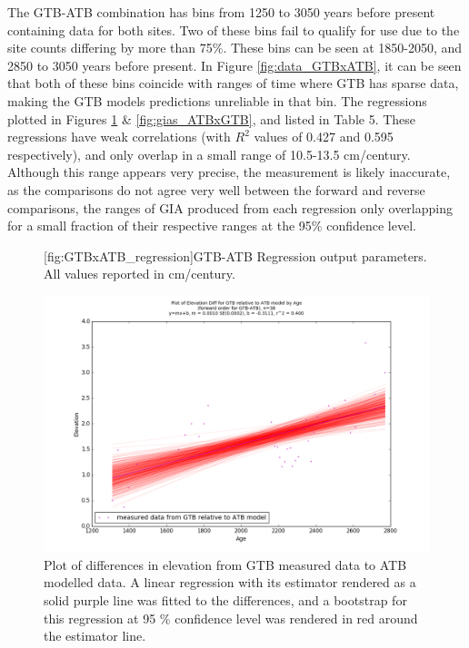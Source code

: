 The GTB-ATB combination has
bins from 1250 to 3050 years before present containing data for both sites. Two of these bins
fail to qualify for use due to the site counts differing by more
than 75\%. These bins can be seen at 1850-2050, and 2850 to 3050 years before present. 
In Figure \ref{fig:data_GTBxATB}, it can be seen that both of these bins coincide with ranges of
time where GTB has sparse data, making the GTB models predictions unreliable in that bin.
The regressions plotted in Figures \ref{fig:gias_GTBxATB} \& \ref{fig:gias_ATBxGTB}, and
listed in Table 5. These regressions have weak correlations
(with $R^2$ values of 0.427 and 0.595 respectively), and only overlap in a small
range of 10.5-13.5 cm/century. Although this range appears very precise, the measurement
is likely inaccurate, as the comparisons do not agree very well between the forward
and reverse comparisons, the ranges of GIA produced from each regression only
overlapping for a small fraction of their respective ranges at the 95\% confidence
level.\\

\begin{figure}[H]
	\begin{flushleft}
	
	[fig:GTBxATB_regression]{GTB-ATB Regression output parameters. All values reported in cm/century.}
	
	\end{flushleft}
\end{figure}

\newpage

\begin{figure}[H]
	\includegraphics[width=1.3\linewidth, angle=270 ]{data/bothNonZero/withinSeventyFivePercent/gias/theGIA_GTB_relative_to_ATB.png}
	\caption{Plot of differences in elevation from GTB measured data to ATB modelled data. A linear regression with its estimator rendered as
	 a solid purple line was fitted to the differences, and a bootstrap for this regression at 95 \% confidence level was rendered in red
	 around the estimator line.}
	\label{fig:gias_GTBxATB}
\end{figure}
\newpage


